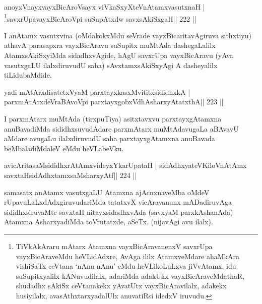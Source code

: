 
\begin{shl}
\footnotemark[1]anoyxVnayxvayxBicAroV\s sayx viVkaSxyXteV\s nAtamxvasutxnaH |
\footnote{TiVkAkAraru mAtarx Atamxna vayxBicAravanenxV savxrUpa
  vayxBicAraveMdu heVLidAdxre, AvAga ililx AtamxveMdare ahaMkAra
  vishiSaTx ceVtana `nAnu nAnu' eMdu heVLikoLuLxva jiVvAtamx, idu
  suSupitxyalilx kANuvudilalx, adariMda adakUkx vayxBicAraveMdathaR,
  shudadhx sAkiSx ceVtanakekx yAvatUtx vayxBicAravilalx, adakekx
  husiyilalx, avasAthxtarxyadalUlx anuvatiRsi idedxV iruvudu.}savxrUpavayxBicAroV\s pi suSupAtxdw savxsAkiSxgaH\hfill || 222 ||
\end{shl}

\begin{artha}
I anAtamx vasutxvina (oMdakokxMdu seVrade vayxBicaritavAgiruva sithxtiyu) athavA parasapxra vayxBicAravu suSupitx muMtAda dashegaLalilx AtamxsAkiSxyiMda sidadhxvAgide, hAgU savxrUpa vayxBicAravu (yAva vasutxgaLU ilalxdiruvudU saha) sAvxtamxsAkiSxyAgi A dasheyalilx tiLidubaMdide.
\end{artha}

\begin{shl}
yadi mAtArxdisatetxVyaM parxtayxkasxMvititxsididhxkA |
parxmAtArxdeVraBAvoV\s pi parxtayxgobxVdhAsharxyAtatxthA\hfill || 223 ||
\end{shl}

\begin{artha}
I  parxmAtarx muMtAda (tirxpuTiya) asitxtavxvu parxtayxgAtamxna anuBavadiMda sididhxsuvudAdare parxmAtarx muMtAdavugaLa aBAvavU aMdare avugaLu ilalxdiruvudU saha parxtayxgAtamxna anuBavada beMbaladiMdaleV eMdu heVLabeVku.
\end{artha}


\begin{shl}
avicAritasaMsididhxrAtAmxvideyxYkarUpataH |
sidAdhxyateV\s KiloV\s nAtAmx savxtaHsidAdhxtamxsaMsharxyAtf\hfill || 224 ||
\end{shl}

\begin{artha}
samasatx anAtamx vasutxgaLU Atamxna ajAcnxnaveMba oMdeV rUpavuLaLxdAdxgiruvudariMda tatatxvX vicAravanunx mADadiruvAga sididhxsiruvaMte savxtaH nitayxsidadhxvAda (savxyaM parxkAshanAda) Atamxna AsharxyadiMda toVrutatxde, aSeTx. (nijavAgi avu ilalx).
\end{artha}

